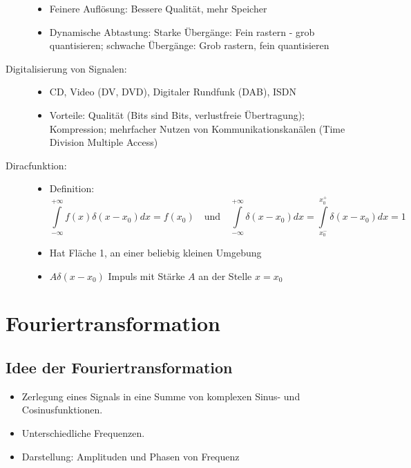 \begin{description}
\begin{itemize}
\item Feinere Auflösung: Bessere Qualität, mehr Speicher
\item Dynamische Abtastung: Starke Übergänge: Fein rastern - grob quantisieren; schwache Übergänge: Grob rastern, fein quantisieren
\end{itemize}
\item[Digitalisierung von Signalen:] \quad
\begin{itemize}
\item CD, Video (DV, DVD), Digitaler Rundfunk (DAB), ISDN
\item Vorteile: Qualität (Bits sind Bits, verlustfreie Übertragung); Kompression; mehrfacher Nutzen von Kommunikationskanälen (Time Division Multiple Access)
\end{itemize}
\item[Diracfunktion\index{Diracfunktion}:]\quad
\begin{itemize}
\item Definition: $$\int\limits_{- \infty}^{+ \infty} f(x) \delta(x - x_0) dx = f(x_0) \quad \textrm{und} \quad \int\limits_{- \infty}^{+ \infty} \delta(x - x_0) dx = \int\limits_{x_0^-}^{x_0^+} \delta(x - x_0) dx = 1$$
\item Hat Fläche 1, an einer beliebig kleinen Umgebung
\item $A \delta(x - x_0)$ Impuls mit Stärke $A$ an der Stelle $x = x_0$
\end{itemize}
\end{description}

\section{Fouriertransformation}

\subsection{Idee der Fouriertransformation}
\begin{itemize}
\item Zerlegung eines Signals in eine Summe von komplexen Sinus- und Cosinusfunktionen.
\item Unterschiedliche Frequenzen.
\item Darstellung: Amplituden und Phasen von Frequenz
\end{itemize}

